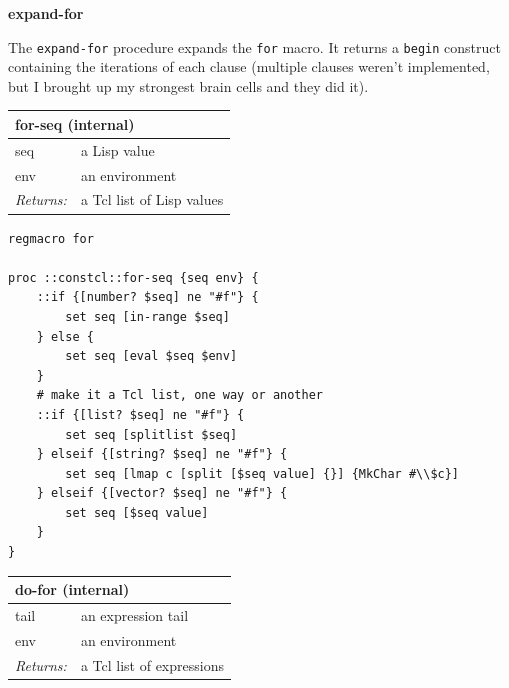 \documentclass[twoside,9pt]{report}
\begin{document}
\textbf{expand-for}


The \texttt{expand-for} procedure expands the \texttt{for} macro. It returns a \texttt{begin} construct containing the iterations of each clause (multiple clauses weren't implemented, but I brought up my strongest brain cells and they did it).

\begin{tabular}{ |l l| }
\hline
\multicolumn{2}{|l|}{for-seq (internal)} \\
\hline
seq & a Lisp value \\
env & an environment \\
\textit{Returns:} & a Tcl list of Lisp values \\
\hline
\end{tabular}

\noindent\makebox[\linewidth]{\rule{\linewidth}{0.4pt}}
\begin{lstlisting}
regmacro for
 
proc ::constcl::for-seq {seq env} {
    ::if {[number? $seq] ne "#f"} {
        set seq [in-range $seq]
    } else {
        set seq [eval $seq $env]
    }
    # make it a Tcl list, one way or another
    ::if {[list? $seq] ne "#f"} {
        set seq [splitlist $seq]
    } elseif {[string? $seq] ne "#f"} { 
        set seq [lmap c [split [$seq value] {}] {MkChar #\\$c}]
    } elseif {[vector? $seq] ne "#f"} {
        set seq [$seq value]
    }
}
\end{lstlisting}
\noindent\makebox[\linewidth]{\rule{\linewidth}{0.4pt}}
\begin{tabular}{ |l l| }
\hline
\multicolumn{2}{|l|}{do-for (internal)} \\
\hline
tail & an expression tail \\
env & an environment \\
\textit{Returns:} & a Tcl list of expressions \\
\hline
\end{tabular}
\end{document}
